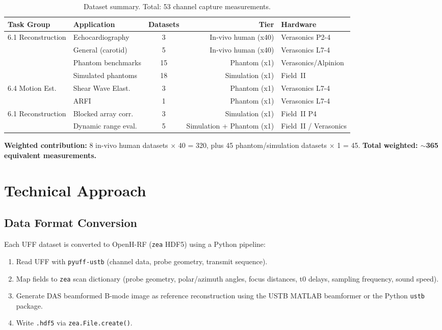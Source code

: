 \documentclass[11pt,a4paper]{article}
\begin{document}
\begin{table}[h!]
\centering
\small
\begin{tabular}{@{}llcrl@{}}
\toprule
\textbf{Task Group} & \textbf{Application} & \textbf{Datasets} & \textbf{Tier} & \textbf{Hardware} \\
\midrule
\multirow{2}{*}{6.1 Reconstruction}
  & Echocardiography     & 3 & In-vivo human (x40) & Verasonics P2-4 \\
  & General (carotid)    & 5 & In-vivo human (x40) & Verasonics L7-4 \\
  & Phantom benchmarks   & 15 & Phantom (x1) & Verasonics/Alpinion \\
  & Simulated phantoms   & 18 & Simulation (x1) & Field~II \\
\midrule
6.4 Motion Est.
  & Shear Wave Elast.    & 3 & Phantom (x1) & Verasonics L7-4 \\
  & ARFI                 & 1 & Phantom (x1) & Verasonics L7-4 \\
\midrule
6.1 Reconstruction
  & Blocked array corr.  & 3 & Simulation (x1) & Field~II P4 \\
  & Dynamic range eval.  & 5 & Simulation + Phantom (x1) & Field~II / Verasonics \\
\bottomrule
\end{tabular}
\caption{Dataset summary. Total: 53 channel capture measurements.}
\end{table}

\noindent\textbf{Weighted contribution:}
8 in-vivo human datasets $\times$ 40 = 320, plus 45 phantom/simulation datasets $\times$ 1 = 45.
\textbf{Total weighted: $\sim$365 equivalent measurements.}

\section{Technical Approach}

\subsection*{Data Format Conversion}
Each UFF dataset is converted to OpenH-RF (\texttt{zea} HDF5) using a Python pipeline:

\begin{enumerate}[nosep]
  \item Read UFF with \texttt{pyuff-ustb} (channel data, probe geometry, transmit sequence).
  \item Map fields to \texttt{zea} scan dictionary (probe geometry, polar/azimuth angles, focus distances, t0 delays, sampling frequency, sound speed).
  \item Generate DAS beamformed B-mode image as reference reconstruction using the USTB MATLAB beamformer or the Python \texttt{ustb} package.
  \item Write \texttt{.hdf5} via \texttt{zea.File.create()}.
\end{enumerate}
\end{document}
